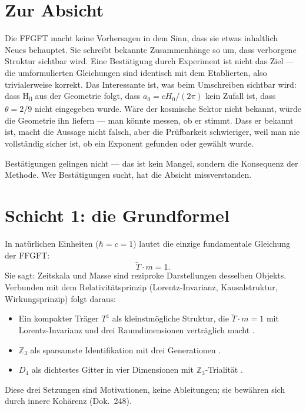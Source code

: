 \section*{Zur Absicht}

Die FFGFT macht keine Vorhersagen in dem Sinn, dass sie etwas inhaltlich
Neues behauptet. Sie schreibt bekannte Zusammenhänge so um, dass verborgene
Struktur sichtbar wird. Eine Bestätigung durch Experiment ist nicht das Ziel
--- die umformulierten Gleichungen sind identisch mit dem Etablierten, also
trivialerweise korrekt. Das Interessante ist, was beim Umschreiben sichtbar
wird: dass H\textsubscript{0} aus der Geometrie folgt, dass $a_0=cH_0/(2\pi)$
kein Zufall ist, dass $\theta=2/9$ nicht eingegeben wurde. Wäre der kosmische
Sektor nicht bekannt, würde die Geometrie ihn liefern --- man könnte messen,
ob er stimmt. Dass er bekannt ist, macht die Aussage nicht falsch, aber die
Prüfbarkeit schwieriger, weil man nie vollständig sicher ist, ob ein Exponent
gefunden oder gewählt wurde.

Bestätigungen gelingen nicht --- das ist kein Mangel, sondern die Konsequenz
der Methode. Wer Bestätigungen sucht, hat die Absicht missverstanden.

\section{Schicht 1: die Grundformel}

In natürlichen Einheiten ($\hbar=c=1$) lautet die einzige fundamentale Gleichung
der FFGFT:
\[
  \tilde{T} \cdot m = 1 .
\]
Sie sagt: Zeitskala und Masse sind reziproke Darstellungen desselben Objekts.
Verbunden mit dem Relativitätsprinzip (Lorentz-Invarianz, Kausalstruktur,
Wirkungsprinzip) folgt daraus:
\begin{itemize}[nosep]
\item Ein kompakter Träger $T^4$ als kleinstmögliche Struktur, die
      $\tilde{T}\cdot m=1$ mit Lorentz-Invarianz und drei Raumdimensionen
      verträglich macht \SetzM.
\item $\mathbb{Z}_3$ als sparsamste Identifikation mit drei Generationen \SetzM.
\item $D_4$ als dichtestes Gitter in vier Dimensionen mit $\mathbb{Z}_3$-Trialität \SetzM.
\end{itemize}
Diese drei Setzungen sind Motivationen, keine Ableitungen; sie bewähren sich
durch innere Kohärenz (Dok.~248).

